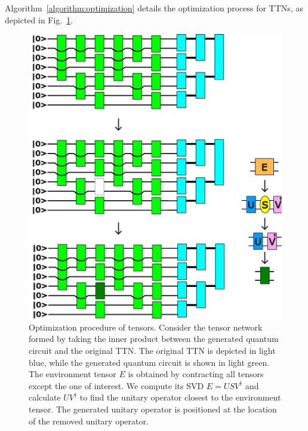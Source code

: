 \documentclass[12pt,dvipdfmx,twoside,openright]{report}
\begin{document}
Algorithm~\ref{algorithm:optimization} details the optimization process for TTNs, as depicted in Fig.~\ref{fig:optimization}.
\begin{figure}
    \centering
    \includegraphics[width=.95\linewidth]{fig-optimization.pdf}
    \caption{Optimization procedure of tensors. 
    Consider the tensor network formed by taking the inner product between the generated quantum circuit and the original TTN.
    The original TTN is depicted in light blue, while the generated quantum circuit is shown in light green.
    The environment tensor $E$ is obtained by contracting all tensors except the one of interest. We compute its SVD $E=USV^\dagger$ and calculate $UV^\dagger$ to find the unitary operator closest to the environment tensor. The generated unitary operator is positioned at the location of the removed unitary operator.}
    \label{fig:optimization}
\end{figure}
\end{document}
